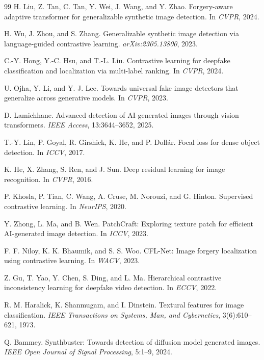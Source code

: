 \documentclass[10pt,twocolumn]{article}
\begin{document}
\begin{thebibliography}{99}
H. Liu, Z. Tan, C. Tan, Y. Wei, J. Wang, and Y. Zhao.
\newblock Forgery-aware adaptive transformer for generalizable synthetic image
  detection.
\newblock In \emph{CVPR}, 2024.

H. Wu, J. Zhou, and S. Zhang.
\newblock Generalizable synthetic image detection via language-guided
  contrastive learning.
\newblock \emph{arXiv:2305.13800}, 2023.

C.-Y. Hong, Y.-C. Hsu, and T.-L. Liu.
\newblock Contrastive learning for deepfake classification and localization via
  multi-label ranking.
\newblock In \emph{CVPR}, 2024.

U. Ojha, Y. Li, and Y. J. Lee.
\newblock Towards universal fake image detectors that generalize across
  generative models.
\newblock In \emph{CVPR}, 2023.

D. Lamichhane.
\newblock Advanced detection of AI-generated images through vision
  transformers.
\newblock \emph{IEEE Access}, 13:3644--3652, 2025.

T.-Y. Lin, P. Goyal, R. Girshick, K. He, and P. Doll{\'a}r.
\newblock Focal loss for dense object detection.
\newblock In \emph{ICCV}, 2017.

K. He, X. Zhang, S. Ren, and J. Sun.
\newblock Deep residual learning for image recognition.
\newblock In \emph{CVPR}, 2016.

P. Khosla, P. Tian, C. Wang, A. Cruse, M. Norouzi, and G. Hinton.
\newblock Supervised contrastive learning.
\newblock In \emph{NeurIPS}, 2020.

Y. Zhong, L. Ma, and B. Wen.
\newblock PatchCraft: Exploring texture patch for efficient AI-generated image
  detection.
\newblock In \emph{ICCV}, 2023.

F. F. Niloy, K. K. Bhaumik, and S. S. Woo.
\newblock CFL-Net: Image forgery localization using contrastive learning.
\newblock In \emph{WACV}, 2023.

Z. Gu, T. Yao, Y. Chen, S. Ding, and L. Ma.
\newblock Hierarchical contrastive inconsistency learning for deepfake video
  detection.
\newblock In \emph{ECCV}, 2022.

R. M. Haralick, K. Shanmugam, and I. Dinstein.
\newblock Textural features for image classification.
\newblock \emph{IEEE Transactions on Systems, Man, and Cybernetics},
  3(6):610--621, 1973.

Q. Bammey.
\newblock Synthbuster: Towards detection of diffusion model generated images.
\newblock \emph{IEEE Open Journal of Signal Processing}, 5:1--9, 2024.

\end{thebibliography}
\end{document}
